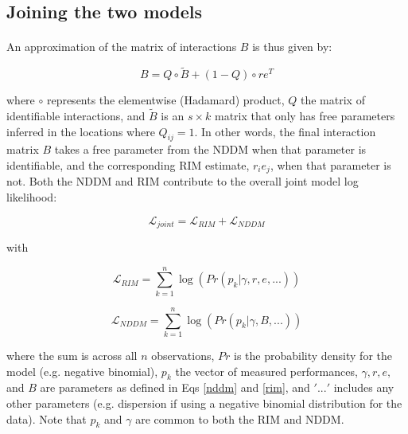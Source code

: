 \documentclass[a4,12pt]{article}
\begin{document}
    \subsection{Joining the two models}
    \label{meth:addlog}

    \paragraph{}
    An approximation of the matrix of interactions $B$ is thus given by:

        \begin{equation}
        B = Q \circ \tilde B + (1 - Q) \circ r e^T
        \label{matB}
        \end{equation}

    
    where $\circ$ represents the elementwise (Hadamard) product, $Q$ the matrix of identifiable interactions, and $\tilde B$ is an $s \times k$ matrix that only has free parameters inferred in the locations where $Q_{ij} =1$. In other words, the final interaction matrix $B$ takes a free parameter from the NDDM when that parameter is identifiable, and the corresponding RIM estimate, $r_i e_j$, when that parameter is not. Both the NDDM and RIM  contribute to the overall joint model log likelihood:

         \begin{equation}
        \mathcal{L}_{joint} = \mathcal{L}_{RIM} + \mathcal{L}_{NDDM}
        \label{loglikjoint}
        \end{equation}

    with

        \begin{equation}
        \mathcal{L}_{RIM} = \sum_{k=1}^{n} \log (Pr (p_k | \gamma, r, e, ...))
        \label{logrim}
        \end{equation}

        \begin{equation}
        \mathcal{L}_{NDDM} = \sum_{k=1}^{n} \log (Pr (p_k | \gamma, B, ...))
        \label{lognddm}
        \end{equation}


    where the sum is across all $n$ observations, $Pr$ is the probability density for the model (e.g. negative binomial), $p_k$ the vector of measured performances, $\gamma, r, e,$ and $B$ are parameters as defined in Eqs \ref{nddm} and \ref{rim}, and $'...'$ includes any other parameters (e.g. dispersion if using a negative binomial distribution for the data). Note that $p_k$ and $\gamma$ are common to both the RIM and NDDM.
\end{document}

